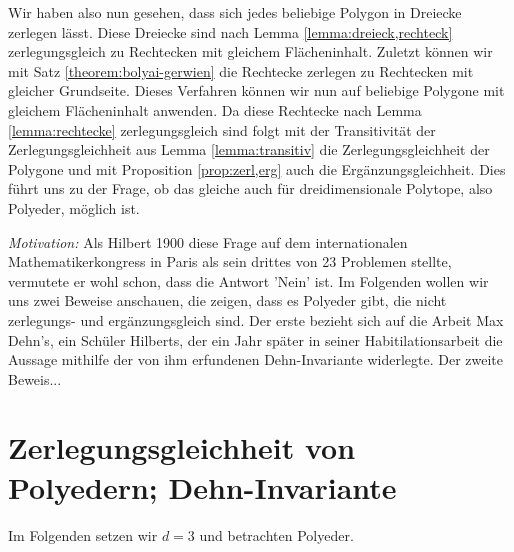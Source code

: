 \documentclass[11pt,titlepage]{article}
\theoremstyle{definition}
\theoremstyle{remark}
\begin{document}
	Wir haben also nun gesehen, dass sich jedes beliebige Polygon in Dreiecke zerlegen lässt. Diese Dreiecke 
	sind nach Lemma \ref{lemma:dreieck,rechteck} zerlegungsgleich zu Rechtecken mit gleichem 
	Flächeninhalt. Zuletzt können wir mit Satz \ref{theorem:bolyai-gerwien} die Rechtecke zerlegen zu Rechtecken 
	mit gleicher Grundseite. Dieses Verfahren können wir nun auf beliebige Polygone mit gleichem Flächeninhalt 
	anwenden. Da diese Rechtecke nach Lemma \ref{lemma:rechtecke} zerlegungsgleich sind folgt mit der 
	Transitivität der Zerlegungsgleichheit aus Lemma \ref{lemma:transitiv} die Zerlegungsgleichheit der Polygone und 
	mit Proposition \ref{prop:zerl,erg} auch die Ergänzungsgleichheit. 
	Dies führt uns zu der Frage, ob das gleiche auch für dreidimensionale Polytope, also Polyeder, möglich ist.
	
	\textsl{Motivation:} Als Hilbert 1900 diese Frage auf dem internationalen Mathematikerkongress in Paris als 
	sein drittes von 23 Problemen stellte, vermutete er wohl schon, dass die Antwort 'Nein' ist. Im Folgenden wollen wir 
	uns zwei Beweise anschauen, die zeigen, dass es Polyeder gibt, die nicht zerlegungs- und ergänzungsgleich sind. 
	Der erste bezieht sich auf die Arbeit Max Dehn's, ein Schüler Hilberts, der ein Jahr später in seiner Habitilationsarbeit 
	die Aussage mithilfe der von ihm erfundenen Dehn-Invariante widerlegte. Der zweite Beweis...
	
	\section{Zerlegungsgleichheit von Polyedern; Dehn-Invariante}
	
	Im Folgenden setzen wir $d=3$ und betrachten Polyeder.
	
\end{document}
